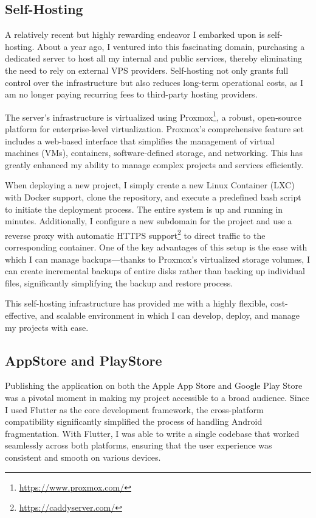 \subsection{Self-Hosting} A relatively recent but highly rewarding endeavor I embarked upon is self-hosting. About a year ago, I ventured into this fascinating domain, purchasing a dedicated server to host all my internal and public services, thereby eliminating the need to rely on external VPS providers. Self-hosting not only grants full control over the infrastructure but also reduces long-term operational costs, as I am no longer paying recurring fees to third-party hosting providers.

The server's infrastructure is virtualized using Proxmox\footnote{\url{https://www.proxmox.com/}}, a robust, open-source platform for enterprise-level virtualization. Proxmox's comprehensive feature set includes a web-based interface that simplifies the management of virtual machines (VMs), containers, software-defined storage, and networking. This has greatly enhanced my ability to manage complex projects and services efficiently.

When deploying a new project, I simply create a new Linux Container (LXC) with Docker support, clone the repository, and execute a predefined bash script to initiate the deployment process. The entire system is up and running in minutes. Additionally, I configure a new subdomain for the project and use a reverse proxy with automatic HTTPS support\footnote{\url{https://caddyserver.com/}} to direct traffic to the corresponding container. One of the key advantages of this setup is the ease with which I can manage backups—thanks to Proxmox's virtualized storage volumes, I can create incremental backups of entire disks rather than backing up individual files, significantly simplifying the backup and restore process.

This self-hosting infrastructure has provided me with a highly flexible, cost-effective, and scalable environment in which I can develop, deploy, and manage my projects with ease.

\subsection{AppStore and PlayStore}
Publishing the application on both the Apple App Store and Google Play Store was a pivotal moment in making my project accessible to a broad audience. Since I used Flutter as the core development framework, the cross-platform compatibility significantly simplified the process of handling Android fragmentation. With Flutter, I was able to write a single codebase that worked seamlessly across both platforms, ensuring that the user experience was consistent and smooth on various devices.

